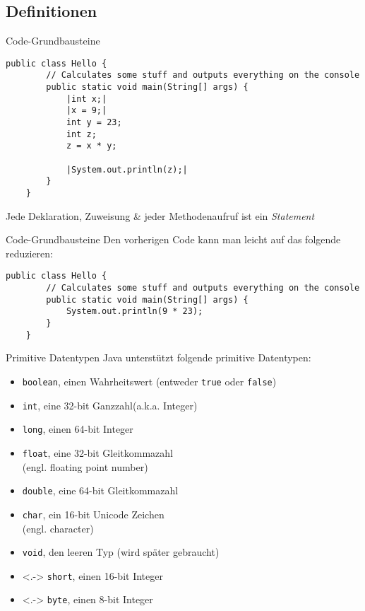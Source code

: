 \subsection{Definitionen}

\begin{frame}[fragile]{Code-Grundbausteine}
    \begin{lstlisting}[gobble=4]
	public class Hello {
	    // Calculates some stuff and outputs everything on the console
	    public static void main(String[] args) {	        
	        |int x;|
	        |x = 9;|
	        int y = 23;
	        int z;
	        z = x * y;
	        
	        |System.out.println(z);|
	    }
	}\end{lstlisting}
    Jede Deklaration, Zuweisung \& jeder Methodenaufruf ist ein \textit{Statement}
\end{frame}

\begin{frame}[fragile]{Code-Grundbausteine}
    Den vorherigen Code kann man leicht auf das folgende reduzieren:
    \begin{lstlisting}[gobble=4]
	public class Hello {
	    // Calculates some stuff and outputs everything on the console
	    public static void main(String[] args) {
	        System.out.println(9 * 23);
	    }
	}\end{lstlisting}
\end{frame}

\begin{frame}{Primitive Datentypen}
	Java unterstützt folgende primitive Datentypen:
    \begin{itemize}[<+->]
        \item\texttt{boolean}, einen Wahrheitswert (entweder \texttt{true} oder \texttt{false})
        \item\texttt{int}, eine 32-bit Ganzzahl(a.k.a. Integer)
        \item\texttt{long}, einen 64-bit Integer
        \item\texttt{float}, eine 32-bit Gleitkommazahl \\
            (engl. floating point number)
        \item\texttt{double}, eine 64-bit Gleitkommazahl
        \item\texttt{char}, ein 16-bit Unicode Zeichen \\ (engl. character)
        \item\texttt{void}, den leeren Typ (wird später gebraucht)
	\end{itemize}
    \begin{itemize}
        \item<.-> \texttt{short}, einen 16-bit Integer
        \item<.-> \texttt{byte}, einen 8-bit Integer
    \end{itemize}
\end{frame}

